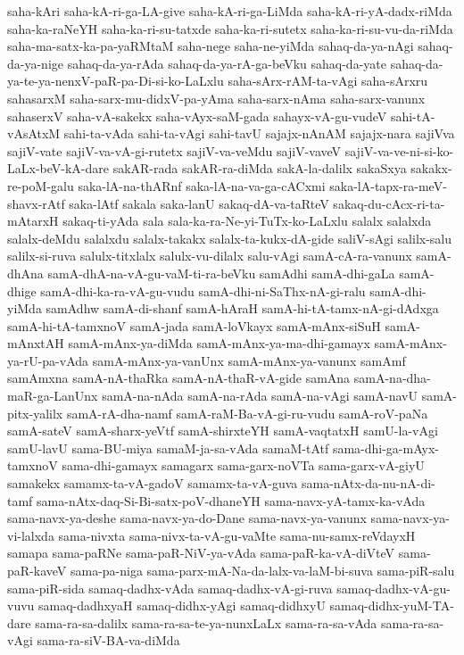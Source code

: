 {saha-kAri
saha-kA-ri-ga-LA-give
saha-kA-ri-ga-LiMda
saha-kA-ri-yA-dadx-riMda
saha-ka-raNeYH
saha-ka-ri-su-tatxde
saha-ka-ri-sutetx
saha-ka-ri-su-vu-da-riMda
saha-ma-satx-ka-pa-yaRMtaM
saha-nege
saha-ne-yiMda
sahaq-da-ya-nAgi
sahaq-da-ya-nige
sahaq-da-ya-rAda
sahaq-da-ya-rA-ga-beVku
sahaq-da-yate
sahaq-da-ya-te-ya-nenxV-paR-pa-Di-si-ko-LaLxlu
saha-sArx-rAM-ta-vAgi
saha-sArxru
sahasarxM
saha-sarx-mu-didxV-pa-yAma
saha-sarx-nAma
saha-sarx-vanunx
sahaserxV
saha-vA-sakekx
saha-vAyx-saM-gada
sahayx-vA-gu-vudeV
sahi-tA-vAsAtxM
sahi-ta-vAda
sahi-ta-vAgi
sahi-tavU
sajajx-nAnAM
sajajx-nara
sajiVva
sajiV-vate
sajiV-va-vA-gi-rutetx
sajiV-va-veMdu
sajiV-vaveV
sajiV-va-ve-ni-si-ko-LaLx-beV-kA-dare
sakAR-rada
sakAR-ra-diMda
sakA-la-dalilx
sakaSxya
sakakx-re-poM-galu
saka-lA-na-thARnf
saka-lA-na-va-ga-cACxmi
saka-lA-tapx-ra-meV-shavx-rAtf
saka-lAtf
sakala
saka-lanU
sakaq-dA-va-taRteV
sakaq-du-cAcx-ri-ta-mAtarxH
sakaq-ti-yAda
sala
sala-ka-ra-Ne-yi-TuTx-ko-LaLxlu
salalx
salalxda
salalx-deMdu
salalxdu
salalx-takakx
salalx-ta-kukx-dA-gide
saliV-sAgi
salilx-salu
salilx-si-ruva
salulx-titxlalx
salulx-vu-dilalx
salu-vAgi
samA-cA-ra-vanunx
samA-dhAna
samA-dhA-na-vA-gu-vaM-ti-ra-beVku
samAdhi
samA-dhi-gaLa
samA-dhige
samA-dhi-ka-ra-vA-gu-vudu
samA-dhi-ni-SaThx-nA-gi-ralu
samA-dhi-yiMda
samAdhw
samA-di-shanf
samA-hAraH
samA-hi-tA-tamx-nA-gi-dAdxga
samA-hi-tA-tamxnoV
samA-jada
samA-loVkayx
samA-mAnx-siSuH
samA-mAnxtAH
samA-mAnx-ya-diMda
samA-mAnx-ya-ma-dhi-gamayx
samA-mAnx-ya-rU-pa-vAda
samA-mAnx-ya-vanUnx
samA-mAnx-ya-vanunx
samAmf
samAmxna
samA-nA-thaRka
samA-nA-thaR-vA-gide
samAna
samA-na-dha-maR-ga-LanUnx
samA-na-nAda
samA-na-rAda
samA-na-vAgi
samA-navU
samA-pitx-yalilx
samA-rA-dha-namf
samA-raM-Ba-vA-gi-ru-vudu
samA-roV-paNa
samA-sateV
samA-sharx-yeVtf
samA-shirxteYH
samA-vaqtatxH
samU-la-vAgi
samU-lavU
sama-BU-miya
samaM-ja-sa-vAda
samaM-tAtf
sama-dhi-ga-mAyx-tamxnoV
sama-dhi-gamayx
samagarx
sama-garx-noVTa
sama-garx-vA-giyU
samakekx
samamx-ta-vA-gadoV
samamx-ta-vA-guva
sama-nAtx-da-nu-nA-di-tamf
sama-nAtx-daq-Si-Bi-satx-poV-dhaneYH
sama-navx-yA-tamx-ka-vAda
sama-navx-ya-deshe
sama-navx-ya-do-Dane
sama-navx-ya-vanunx
sama-navx-ya-vi-lalxda
sama-nivxta
sama-nivx-ta-vA-gu-vaMte
sama-nu-samx-reVdayxH
samapa
sama-paRNe
sama-paR-NiV-ya-vAda
sama-paR-ka-vA-diVteV
sama-paR-kaveV
sama-pa-niga
sama-parx-mA-Na-da-lalx-va-laM-bi-suva
sama-piR-salu
sama-piR-sida
samaq-dadhx-vAda
samaq-dadhx-vA-gi-ruva
samaq-dadhx-vA-gu-vuvu
samaq-dadhxyaH
samaq-didhx-yAgi
samaq-didhxyU
samaq-didhx-yuM-TA-dare
sama-ra-sa-dalilx
sama-ra-sa-te-ya-nunxLaLx
sama-ra-sa-vAda
sama-ra-sa-vAgi
sama-ra-siV-BA-va-diMda
}
